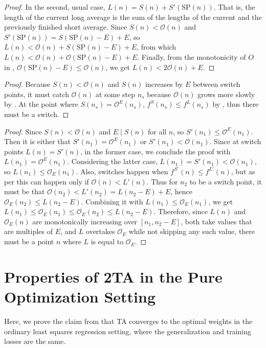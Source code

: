 \documentclass[twocolumn]{article}
\newcommand*{\SP}{\mathrm{SP}}
\newcommand{\divides}{\mathrel{|}}
\newcommand{\OL}{\mathcal{O}}
\newcommand{\tta}{\liningnums{2}TA}
\begin{document}
\begin{appendices}
\begin{proof}
In the second, usual case, $L(n) = S(n) + S'\!(\SP(n))$.
That is, the length of the current long average is the sum of the lengths of the current and the previously finished short average.
Since $S(n) < \OL(n)$ and $S'\!(\SP(n)) = S(\SP(n)-E) + E$, so $L(n) < \OL(n) + S(\SP(n)-E) + E$, from which $L(n) < \OL(n) + \OL(\SP(n)-E) + E$.
Finally, from the monotonicity of $O$ in , $\OL(\SP(n)-E) \leq \OL(n)$, we get $L(n) < 2\OL(n) + E$.
\end{proof}

\propinfinite*

\begin{proof}
Because $S(n) < \OL(n)$ and $S(n)$ increases by $E$ between switch points, it must catch $\OL(n)$ at some step $n_s$ because $\OL(n)$ grows more slowly by .
At the point where $S(n_s) = \OL^E(n_s)$, $f^S(n_s) \leq f^L(n_s)$ by , thus there must be a switch.
\end{proof}

\proponce*

\begin{proof}
Since $S(n) < \OL(n)$ and $E \divides S(n)$ for all $n$, so $S'\!(n_1) \leq \OL^E(n_1)$.
Then it is either that $S'\!(n_1) = \OL^E(n_1)$ or $S'\!(n_1) < \OL(n_1)$.
Since at switch points $L(n)=S'\!(n)$, in the former case, we conclude the proof with $L(n_1) = \OL^E(n_1)$.
Considering the latter case, $L(n_1) = S'\!(n_1) < \OL(n_1)$, so $L(n_1) \leq \OL_E(n_1)$.
Also, switches happen when $f^{S'\!\!}(n) \leq f^{L'\!\!}(n)$, but as per  this can happen only if $\OL(n) < L'\!(n)$.
Thus for $n_2$ to be a switch point, it must be that $\OL(n_2) < L'\!(n_2) = L(n_2-E) + E$, hence $\OL_E(n_2) \leq L(n_2-E)$.
Combining it with $L(n_1) \leq \OL_E(n_1)$, we get $L(n_1) \leq \OL_E(n_1) \leq \OL_E(n_2) \leq L(n_2-E)$.
Therefore, since $L(n)$ and $\OL_E(n)$ are monotonically increasing over $[n_1,n_2-E]$, both take values that are multiples of $E$, and $L$ overtakes $\OL_E$ while not skipping any such value, there must be a point $n$ where $L$ is equal to $\OL_E$.
\end{proof}


\section{Properties of 2TA in the Pure Optimization Setting}
\label{sec:properties-of-tta-in-pure-optimization}

Here, we prove the claim from  that \tta{} converges to the optimal weights in the ordinary least squares regression setting, where the generalization and training losses are the same.


\end{appendices}
\end{document}
